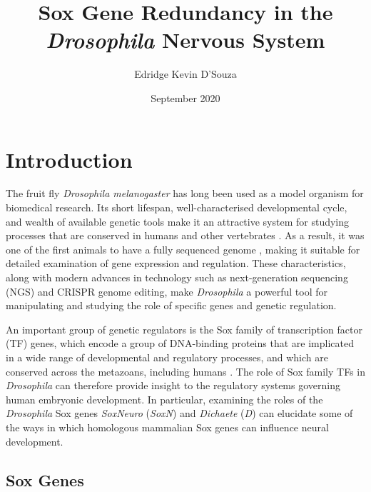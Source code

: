 \documentclass[withindex,glossary]{cam-thesis}
\title{Sox Gene Redundancy in the \emph{Drosophila} Nervous System}
\author{Edridge Kevin D'Souza}
\date{September 2020}
\begin{document}
\frontmatter{}



\chapter{Introduction}
The fruit fly \emph{Drosophila melanogaster} has long been used as a
model organism for biomedical research. Its short lifespan,
well-characterised developmental cycle, and wealth of available genetic
tools make it an attractive system for studying processes that are
conserved in humans and other vertebrates . As a
result, it was one of the first animals to have a fully sequenced genome
, making it suitable for detailed examination of
gene expression and regulation. These characteristics, along with modern
advances in technology such as next-generation sequencing (\gls{NGS}) and
CRISPR genome editing, make \emph{Drosophila} a powerful tool for
manipulating and studying the role of specific genes and genetic
regulation.

An important group of genetic regulators is the Sox family of
transcription factor (\gls{TF}) genes, which encode a group of DNA-binding
proteins that are implicated in a wide range of developmental and
regulatory processes, and which are conserved across the metazoans,
including humans . The role of Sox family TFs
in \emph{Drosophila} can therefore provide insight to the regulatory
systems governing human embryonic development. In particular, examining
the roles of the \emph{Drosophila} Sox genes \emph{SoxNeuro}
(\emph{\gls{SoxN}}) and \emph{Dichaete} (\emph{\gls{D}}) can elucidate some of the
ways in which homologous mammalian Sox genes can influence neural
development.

\section{Sox Genes}
\end{document}
